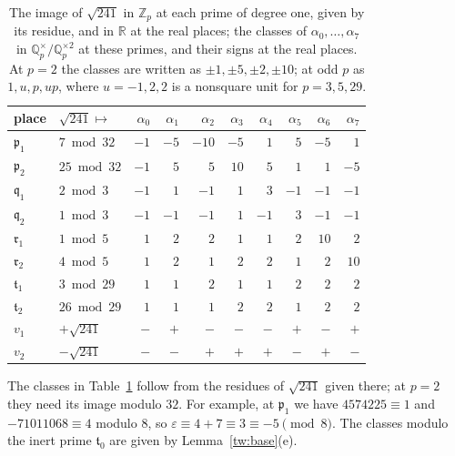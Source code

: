 \documentclass[11pt]{amsart}
\numberwithin{equation}{section}
\theoremstyle{definition}
\theoremstyle{remark}
\newcommand{\Q}{\mathbb Q}
\newcommand{\R}{\mathbb R}
\newcommand{\Z}{\mathbb Z}
\begin{document}
\begin{table}[htbp]
\centering
\caption{The image of $\sqrt{241}$ in $\Z_p$ at each prime of degree one,
given by its residue, and in $\R$ at the real places; the classes of
$\alpha_0,\dots,\alpha_7$ in $\Q_p^\times/\Q_p^{\times2}$ at these primes, and
their signs at the real places. At $p=2$ the classes are written as
$\pm1,\pm5,\pm2,\pm10$; at odd $p$ as $1,u,p,up$, where $u=-1,2,2$ is a
nonsquare unit for $p=3,5,29$.}
\label{tw:squareclass-table}
\begin{tabular}{llrrrrrrrr}
\toprule
place & $\sqrt{241}\mapsto$ & $\alpha_0$ & $\alpha_1$ & $\alpha_2$ & $\alpha_3$ & $\alpha_4$ & $\alpha_5$ & $\alpha_6$ & $\alpha_7$\\
\midrule
$\mathfrak p_1$ & $7\bmod 32$ & $-1$ & $-5$ & $-10$ & $-5$ & $1$ & $5$ & $-5$ & $1$\\
$\mathfrak p_2$ & $25\bmod 32$ & $-1$ & $5$ & $5$ & $10$ & $5$ & $1$ & $1$ & $-5$\\
$\mathfrak q_1$ & $2\bmod 3$ & $-1$ & $1$ & $-1$ & $1$ & $3$ & $-1$ & $-1$ & $-1$\\
$\mathfrak q_2$ & $1\bmod 3$ & $-1$ & $-1$ & $-1$ & $1$ & $-1$ & $3$ & $-1$ & $-1$\\
$\mathfrak r_1$ & $1\bmod 5$ & $1$ & $2$ & $2$ & $1$ & $1$ & $2$ & $10$ & $2$\\
$\mathfrak r_2$ & $4\bmod 5$ & $1$ & $2$ & $1$ & $2$ & $2$ & $1$ & $2$ & $10$\\
$\mathfrak t_1$ & $3\bmod 29$ & $1$ & $1$ & $2$ & $1$ & $1$ & $2$ & $2$ & $2$\\
$\mathfrak t_2$ & $26\bmod 29$ & $1$ & $1$ & $1$ & $2$ & $2$ & $1$ & $2$ & $2$\\
$v_1$ & $+\sqrt{241}$ & $-$ & $+$ & $-$ & $-$ & $-$ & $+$ & $-$ & $+$\\
$v_2$ & $-\sqrt{241}$ & $-$ & $-$ & $+$ & $+$ & $+$ & $-$ & $+$ & $-$\\
\bottomrule
\end{tabular}
\end{table}

The classes in Table~\ref{tw:squareclass-table} follow from the residues of
$\sqrt{241}$ given there; at $p=2$ they need its image modulo $32$. For
example, at $\mathfrak p_1$ we have $4574225\equiv1$ and $-71011068\equiv4$
modulo $8$, so $\varepsilon\equiv4+7\equiv3\equiv-5\pmod 8$. The classes
modulo the inert prime $\mathfrak t_0$ are given by Lemma~\ref{tw:base}(e).
\end{document}

